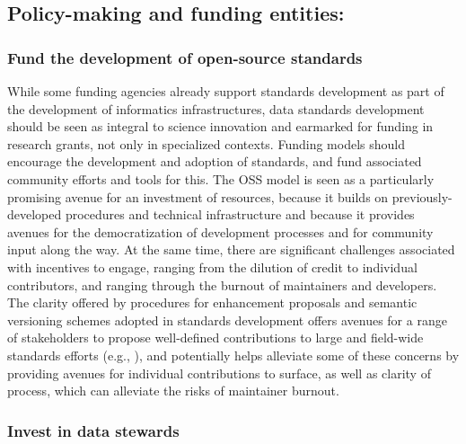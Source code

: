 \documentclass[
  number]{elsarticle}
\begin{document}
\subsection{Policy-making and funding
entities:}\label{policy-making-and-funding-entities}

\subsubsection{Fund the development of open-source
standards}\label{fund-the-development-of-open-source-standards}

While some funding agencies already support standards development as
part of the development of informatics infrastructures, data standards
development should be seen as integral to science innovation and
earmarked for funding in research grants, not only in specialized
contexts. Funding models should encourage the development and adoption
of standards, and fund associated community efforts and tools for this.
The OSS model is seen as a particularly promising avenue for an
investment of resources, because it builds on previously-developed
procedures and technical infrastructure and because it provides avenues
for the democratization of development processes and for community input
along the way. At the same time, there are significant challenges
associated with incentives to engage, ranging from the dilution of
credit to individual contributors, and ranging through the burnout of
maintainers and developers. The clarity offered by procedures for
enhancement proposals and semantic versioning schemes adopted in
standards development offers avenues for a range of stakeholders to
propose well-defined contributions to large and field-wide standards
efforts (e.g., \citep{pestilli2021community}), and potentially helps
alleviate some of these concerns by providing avenues for individual
contributions to surface, as well as clarity of process, which can
alleviate the risks of maintainer burnout.

\subsubsection{Invest in data stewards}\label{invest-in-data-stewards}
\end{document}
